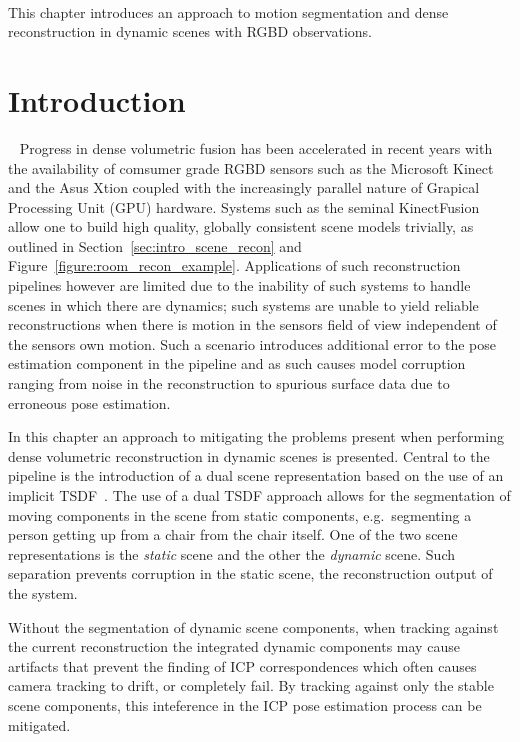 ~\label{chap:moseg}
\begin{chapterabstract}
This chapter introduces an approach to motion segmentation and dense reconstruction 
in dynamic scenes with RGBD observations.
\end{chapterabstract}

\section{Introduction}
~\label{sec:moseg_introduction}
Progress in dense volumetric fusion has been accelerated in recent years with
the availability of comsumer grade RGBD sensors such as the Microsoft Kinect and
the Asus Xtion coupled with the increasingly parallel nature of Grapical Processing 
Unit (GPU) hardware. Systems such as the seminal KinectFusion~\cite{Newcombe2011} 
allow one to build high quality, globally consistent scene models trivially, as 
outlined in Section~\ref{sec:intro_scene_recon} and Figure~\ref{figure:room_recon_example}.
Applications of such reconstruction pipelines however are limited due to the 
inability of such systems to handle scenes in which there are dynamics; such 
systems are unable to yield reliable reconstructions when there is motion in the 
sensors field of view independent of the sensors own motion. Such a scenario introduces
additional error to the pose estimation component in the pipeline and as such
causes model corruption ranging from noise in the reconstruction to spurious 
surface data due to erroneous pose estimation.

In this chapter an approach to mitigating the problems present when performing 
dense volumetric reconstruction in dynamic scenes is presented. Central to the
pipeline is the introduction of a dual scene representation based on the use
of an implicit TSDF~\cite{Curless1996}. The use of a dual TSDF approach allows
for the segmentation of moving components in the scene from static components,
e.g.\ segmenting a person getting up from a chair from the chair itself. One of
the two scene representations is the \textit{static} scene and the other the
\textit{dynamic} scene. Such separation prevents corruption in the static scene,
the reconstruction output of the system.

Without the segmentation of dynamic scene components, when tracking against the
current reconstruction the integrated dynamic components may cause artifacts
that prevent the finding of ICP correspondences which often causes camera
tracking to drift, or completely fail. By tracking against only the stable
scene components, this inteference in the ICP pose estimation process can be
mitigated.

